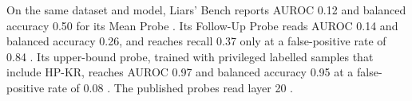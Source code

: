 On the same dataset and model, Liars' Bench reports AUROC 0.12 and balanced accuracy 0.50 for its Mean Probe \parencite[p.~54]{kretschmar2025liars}. %
Its Follow-Up Probe reads AUROC 0.14 and balanced accuracy 0.26, and reaches recall 0.37 only at a false-positive rate of 0.84 \parencite[p.~55]{kretschmar2025liars}. %
Its upper-bound probe, trained with privileged labelled samples that include HP-KR, reaches AUROC 0.97 and balanced accuracy 0.95 at a false-positive rate of 0.08 \parencite[p.~8, p.~56]{kretschmar2025liars}. %
The published probes read layer 20 \parencite[p.~69]{kretschmar2025liars}. %

